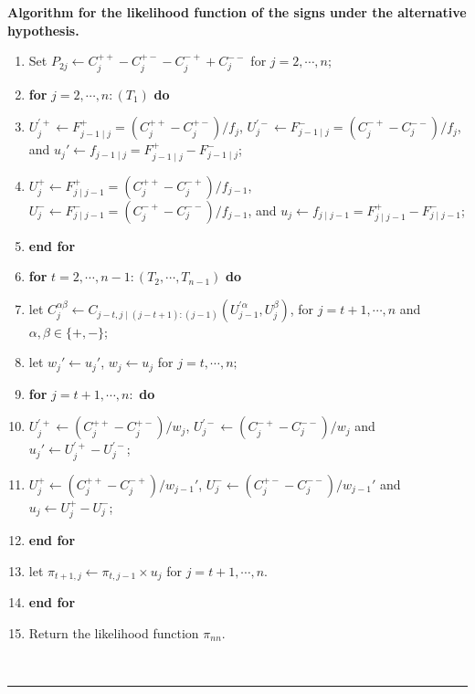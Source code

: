 \documentclass[harvard,11pt]{article}
\newenvironment{proof}[1][Proof]{\textbf{#1.} }{\  \rule{0.5em}{0.5em}}
\begin{document}
\begin{proof}[Algorithm for the likelihood function of the signs under the alternative hypothesis]
\begin{enumerate}
\item  Set $P_{2j}\leftarrow C^{++}_j-C^{+-}_j-C^{-+}_j+C^{--}_j$ for $j=2,\cdots,n$;
\item \textbf{for} $j=2,\cdots,n:\left(T_1\right)$ \textbf{do}
\item \hspace{10pt} \parbox[t]{\linegoal}{$U_j^{'+}\leftarrow F_{j-1\mid j}^{+}=\left(C^{++}_j-C^{+-}_j\right)/f_j$, $U_j^{'-}\leftarrow F_{j-1\mid j}^{-}=\left(C^{-+}_j-C^{--}_j\right)/f_j$, and $u_j'\leftarrow f_{j-1\mid j}=F_{j-1\mid j}^{+}-F_{j-1\mid j}^{-}$;}
\item \hspace{10pt} \parbox[t]{\linegoal}{$U_j^{+}\leftarrow F_{j\mid j-1}^{+}=\left(C^{++}_j-C^{-+}_j\right)/f_{j-1}$, $U_j^{-}\leftarrow F_{j\mid j-1}^{-}=\left(C^{-+}_j-C^{--}_j\right)/f_{j-1}$, and $u_j\leftarrow f_{j\mid j-1}=F_{j\mid j-1}^{+}-F_{j\mid j-1}^{-}$;}
\item \textbf{end for}
\item \textbf{for} $t=2,\cdots,n-1: \left(T_2,\cdots,T_{n-1}\right)$ \textbf{do}
\item\hspace{10pt} let $C^{\alpha\beta}_j\leftarrow C_{j-t,j\mid (j-t+1):(j-1)}\left(U^{'\alpha}_{j-1},U^{\beta}_j\right)$, for $j=t+1,\cdots,n$ and $\alpha,\beta\in\{+,-\}$; 
\item\hspace{10pt} let $w_{j}'\leftarrow u_{j}'$, $w_{j}\leftarrow u_{j}$ for $j=t,\cdots,n;$
\item\hspace{10pt} \textbf{for} $j=t+1,\cdots,n:$ \textbf{do}
\item\hspace{30pt} $U^{'+}_{j}\leftarrow \left(C^{++}_j-C^{+-}_j\right)/w_j$, $U^{'-}_{j}\leftarrow \left(C^{-+}_j-C^{--}_j\right)/w_j$ and $u_j'\leftarrow U^{'+}_{j}-U^{'-}_{j}$;
\item\hspace{30pt} $U^{+}_{j}\leftarrow \left(C^{++}_j-C^{-+}_j\right)/w_{j-1}'$, $U^{-}_{j}\leftarrow \left(C^{+-}_j-C^{--}_j\right)/w_{j-1}'$ and $u_j\leftarrow U^{+}_{j}-U^{-}_{j}$;
\item\hspace{10pt} \textbf{end for}
\item\hspace{10pt} let $\pi_{t+1,j}\leftarrow \pi_{t,j-1}\times u_j$ for $j=t+1,\cdots,n$.
\item\textbf{end for}
\item Return the likelihood function $\pi_{nn}$.
\end{enumerate}
\end{proof}
\end{document}
